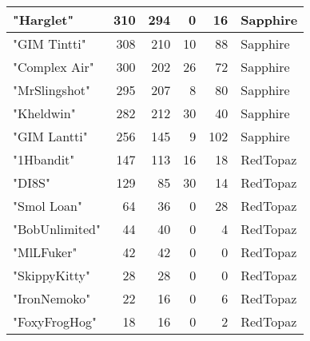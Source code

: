 \documentclass{article}
\begin{document}
\begin{table}[htbp]
\begin{tabular}{|l|r|r|r|r|l|}
"Harglet" & 310 & 294 & 0 & 16 & Sapphire \\ \hline
"GIM Tintti" & 308 & 210 & 10 & 88 & Sapphire \\ \hline
"Complex Air" & 300 & 202 & 26 & 72 & Sapphire \\ \hline
"MrSlingshot" & 295 & 207 & 8 & 80 & Sapphire \\ \hline
"Kheldwin" & 282 & 212 & 30 & 40 & Sapphire \\ \hline
"GIM Lantti" & 256 & 145 & 9 & 102 & Sapphire \\ \hline
"1Hbandit" & 147 & 113 & 16 & 18 & RedTopaz \\ \hline
"DI8S" & 129 & 85 & 30 & 14 & RedTopaz \\ \hline
"Smol Loan" & 64 & 36 & 0 & 28 & RedTopaz \\ \hline
"BobUnlimited" & 44 & 40 & 0 & 4 & RedTopaz \\ \hline
"MlLFuker" & 42 & 42 & 0 & 0 & RedTopaz \\ \hline
"SkippyKitty" & 28 & 28 & 0 & 0 & RedTopaz \\ \hline
"IronNemoko" & 22 & 16 & 0 & 6 & RedTopaz \\ \hline
"FoxyFrogHog" & 18 & 16 & 0 & 2 & RedTopaz \\ \hline
\end{tabular}
\end{table}
\end{document}
